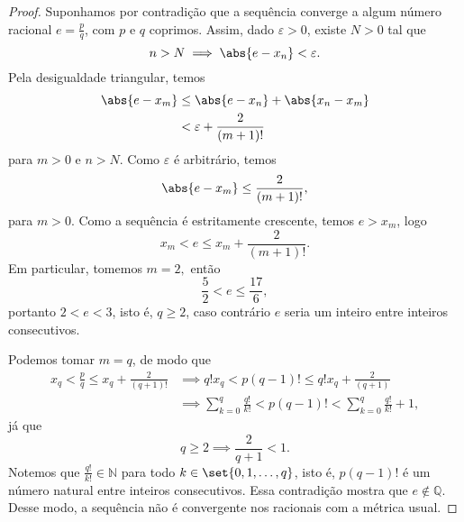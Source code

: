 \begin{proof}
    Suponhamos por contradição que a sequência converge a algum número racional \(e = \frac{p}{q}\), com \(p\) e \(q\) coprimos. Assim, dado \(\varepsilon > 0\), existe \(N > 0\) tal que
    \begin{equation*}
        n > N \implies \abs{e - x_n} < \varepsilon.
    \end{equation*}
    Pela desigualdade triangular, temos
    \begin{align*}
        \abs{e - x_m} &\leq \abs{e - x_n} + \abs{x_n - x_m}\\
                      &< \varepsilon + \frac{2}{(m+1)!}
    \end{align*}
    para \(m > 0\) e \(n > N\). Como \(\varepsilon\) é arbitrário, temos
    \begin{equation*}
        \abs{e - x_m} \leq \frac{2}{(m+1)!},
    \end{equation*}
    para \(m > 0\). Como a sequência é estritamente crescente, temos \(e > x_m\), logo
    \begin{equation*}
        x_m < e \leq x_m + \frac{2}{(m+1)!}.
    \end{equation*}
    Em particular, tomemos \(m = 2,\) então
    \begin{equation*}
        \frac52 < e \leq \frac{17}{6},
    \end{equation*}
    portanto \(2 < e < 3\), isto é, \(q \geq 2\), caso contrário \(e\) seria um inteiro entre inteiros consecutivos.

    Podemos tomar \(m = q\), de modo que
    \begin{align*}
        x_q < \frac{p}{q} \leq x_q + \frac{2}{(q+1)!} &\implies q!x_q < p(q-1)! \leq q!x_q + \frac{2}{(q+1)}\\
                                                      &\implies \sum_{k = 0}^{q} \frac{q!}{k!} < p(q-1)! < \sum_{k = 0}^{q} \frac{q!}{k!} + 1,
    \end{align*}
    já que
    \begin{equation*}
        q \geq 2 \implies \frac{2}{q+1} < 1.
    \end{equation*}
    Notemos que \(\frac{q!}{k!} \in \mathbb{N}\) para todo \(k \in \set{0, 1, \dots, q}\), isto é, \(p(q - 1)!\) é um número natural entre inteiros consecutivos. Essa contradição mostra que \(e \notin \mathbb{Q}.\) Desse modo, a sequência não é convergente nos racionais com a métrica usual.
\end{proof}

